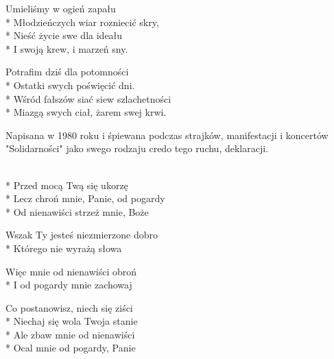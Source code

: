 \begin{lyrics}[longestline={Na stos rzuciliśmy -- swój życia los,}]
\chorusref
Umieliśmy w ogień zapału\\*
Młodzieńczych wiar rozniecić skry,\\*
Nieść życie swe dla ideału\\*
I swoją krew, i marzeń sny.

\chorusref

Potrafim dziś dla potomności\\*
Ostatki swych poświęcić dni.\\*
Wśród fałszów siać siew szlachetności\\*
Miazgą swych ciał, żarem swej krwi.

\chorusref
\end{lyrics}



\begin{info}Napisana w 1980 roku i śpiewana podczas strajków, manifestacji i koncertów "Solidarności" jako swego rodzaju credo tego ruchu, deklaracji. \end{info}

\begin{lyrics}[longestline={Lecz chroń mnie, Panie, od pogardy}]

\\*
Przed mocą Twą się ukorzę\\*
Lecz chroń mnie, Panie, od pogardy\\*
Od nienawiści strzeż mnie, Boże

Wszak Ty jesteś niezmierzone dobro\\*
Którego nie wyrażą słowa

Więc mnie od nienawiści obroń\\*
I od pogardy mnie zachowaj

Co postanowisz, niech się ziści\\*
Niechaj się wola Twoja stanie\\*
Ale zbaw mnie od nienawiści\\*
Ocal mnie od pogardy, Panie
\end{lyrics}




